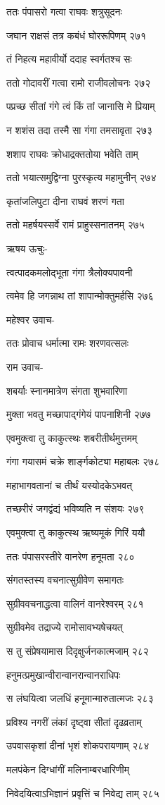 ततः पंपासरो गत्वा राघवः शत्रुसूदनः

जघान राक्षसं तत्र कबंधं घोररूपिणम् २७१

तं निहत्य महावीर्यो ददाह स्वर्गतश्च सः

ततो गोदावरीं गत्वा रामो राजीवलोचनः २७२

पप्रच्छ सीतां गंगे त्वं किं तां जानासि मे प्रियाम्

न शशंस तदा तस्मै सा गंगा तमसावृता २७३

शशाप राघवः क्रोधाद्रक्ततोया भवेति ताम्

ततो भयात्समुद्विग्ना पुरस्कृत्य महामुनीन् २७४

कृतांजलिपुटा दीना राघवं शरणं गता

ततो महर्षयस्सर्वे रामं प्राहुस्सनातनम् २७५

ऋषय ऊचुः-

त्वत्पादकमलोद्भूता गंगा त्रैलोक्यपावनी

त्वमेव हि जगन्नाथ तां शापान्मोक्तुमर्हसि २७६

महेश्वर उवाच-

ततः प्रोवाच धर्मात्मा रामः शरणवत्सलः

राम उवाच-

शबर्याः स्नानमात्रेण संगता शुभवारिणा

मुक्ता भवतु मच्छापाद्गंगेयं पापनाशिनी २७७

एवमुक्त्वा तु काकुत्स्थः शबरीतीर्थमुत्तमम्

गंगा गयासमं चक्रे शार्ङ्गकोट्या महाबलः २७८

महाभागवतानां च तीर्थं यस्योदकेऽभवत्

तच्छरीरं जगद्वंद्यं भविष्यति न संशयः २७९

एवमुक्त्वा तु काकुत्स्थ ऋष्यमूकं गिरिं ययौ

ततः पंपासरस्तीरे वानरेण हनूमता २८०

संगतस्तस्य वचनात्सुग्रीवेण समागतः

सुग्रीववचनाद्धत्वा वालिनं वानरेश्वरम् २८१

सुग्रीवमेव तद्राज्ये रामोसावभ्यषेचयत्

स तु संप्रेषयामास दिदृक्षुर्जनकात्मजाम् २८२

हनुमत्प्रमुखान्वीरान्वानरान्वानराधिपः

स लंघयित्वा जलधिं हनूमान्मारुतात्मजः २८३

प्रविश्य नगरीं लंकां दृष्ट्वा सीतां दृढव्रताम्

उपवासकृशां दीनां भृशं शोकपरायणाम् २८४

मलपंकेन दिग्धांगीं मलिनाम्बरधारिणीम्

निवेदयित्वाऽभिज्ञानं प्रवृत्तिं च निवेद्य ताम् २८५

